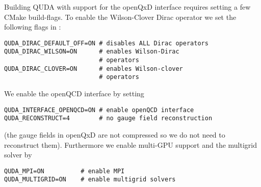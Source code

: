 






Building QUDA with support for the openQxD interface requires setting a few CMake build-flags. To enable the Wilson-Clover Dirac operator we set the following flags in  \cite{QUDApaper}:
\begin{lstlisting}[]
QUDA_DIRAC_DEFAULT_OFF=ON # disables ALL Dirac operators
QUDA_DIRAC_WILSON=ON      # enables Wilson-Dirac
                          # operators
QUDA_DIRAC_CLOVER=ON      # enables Wilson-clover
                          # operators
\end{lstlisting}
We enable the openQCD interface by setting
\begin{lstlisting}[]
QUDA_INTERFACE_OPENQCD=ON # enable openQCD interface
QUDA_RECONSTRUCT=4        # no gauge field reconstruction
\end{lstlisting}
(the gauge fields in openQxD are not compressed so we do not need to reconstruct them). Furthermore we enable multi-GPU support and the multigrid solver by
\begin{lstlisting}[]
QUDA_MPI=ON          # enable MPI
QUDA_MULTIGRID=ON    # enable multigrid solvers
\end{lstlisting}

